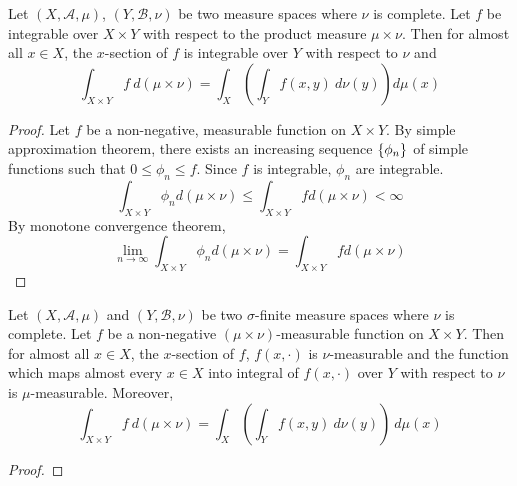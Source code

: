 \begin{theorem}[Fubini]
	Let $(X,\mathcal{A},\mu)$, $(Y,\mathcal{B},\nu)$ be two measure spaces where $\nu$ is complete.
	Let $f$ be integrable over $X \times Y$ with respect to the product measure $\mu \times \nu$.
	Then for almost all $x \in X$, the $x$-section of $f$ is integrable over $Y$ with respect to $\nu$ and
	\begin{equation}
		\int_{X \times Y} f \ d(\mu \times \nu) = \int_X \left( \int_Y f(x,y) \ d\nu(y) \right) d\mu(x)
	\end{equation}
\end{theorem}
\begin{proof}
	Let $f$ be a non-negative, measurable function on $X \times Y$.
	By simple approximation theorem, there exists an increasing sequence $\left\{\phi_n\right\}$ of simple functions such that $0 \le \phi_n \le f$.
	Since $f$ is integrable, $\phi_n$ are integrable.
	\[ \int_{X \times Y} \phi_n d(\mu \times \nu) \le \int_{X \times Y} f d(\mu \times \nu) < \infty \]
	By monotone convergence theorem,
	\[ \lim_{n \to \infty} \int_{X \times Y} \phi_n d(\mu \times \nu) = \int_{X \times Y} f d(\mu \times \nu) \]

\end{proof}

\begin{theorem}[Tonelli]
	Let $(X,\mathcal{A},\mu)$ and $(Y,\mathcal{B},\nu)$ be two $\sigma$-finite measure spaces where $\nu$ is complete.
	Let $f$ be a non-negative $(\mu \times \nu)$-measurable function on $X \times Y$.
	Then for almost all $x \in X$, the $x$-section of $f$, $f(x,\cdot)$ is $\nu$-measurable and the function which maps almost every $x \in X$ into integral of $f(x,\cdot)$ over $Y$ with respect to $\nu$ is $\mu$-measurable.
	Moreover,
	\begin{equation}
		\int_{X \times Y} f \ d(\mu \times \nu) = \int_X \left( \int_Y f(x,y) \ d\nu(y) \right) \ d\mu(x)
	\end{equation}
\end{theorem}
\begin{proof}
\end{proof}

